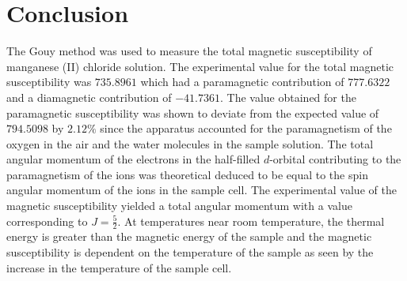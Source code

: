 \documentclass[a4paper,11pt]{article}
\begin{document}
\section{Conclusion}

The Gouy method was used to measure the total magnetic susceptibility of manganese (II) chloride solution. The experimental value for the total magnetic susceptibility was $735.8961$ which had a paramagnetic contribution of $777.6322$ and a diamagnetic contribution of $-41.7361$. The value obtained for the paramagnetic susceptibility was shown to deviate from the expected value of $794.5098$ by $2.12\%$ since the apparatus accounted for the paramagnetism of the oxygen in the air and the water molecules in the sample solution. The total angular momentum of the electrons in the half-filled $d$-orbital contributing to the paramagnetism of the  ions was theoretical deduced to be equal to the spin angular momentum of the  ions in the sample cell. The experimental value of the magnetic susceptibility yielded a total angular momentum with a value corresponding to $J=\frac{5}{2}$. At temperatures near room temperature, the thermal energy is greater than the magnetic energy of the sample and the magnetic susceptibility is dependent on the temperature of the sample as seen by the increase in the temperature of the sample cell.



\end{document}
